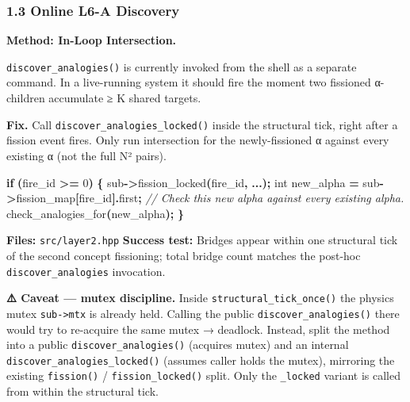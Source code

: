 \documentclass[
  11pt,
  a4paper,
]{article}
\newenvironment{Shaded}{\begin{snugshade}}{\end{snugshade}}
\newcommand{\CommentTok}[1]{\textcolor[rgb]{0.56,0.35,0.01}{\textit{#1}}}
\newcommand{\ControlFlowTok}[1]{\textcolor[rgb]{0.13,0.29,0.53}{\textbf{#1}}}
\newcommand{\DataTypeTok}[1]{\textcolor[rgb]{0.13,0.29,0.53}{#1}}
\newcommand{\DecValTok}[1]{\textcolor[rgb]{0.00,0.00,0.81}{#1}}
\newcommand{\NormalTok}[1]{#1}
\newcommand{\OperatorTok}[1]{\textcolor[rgb]{0.81,0.36,0.00}{\textbf{#1}}}
\begin{document}
\subsubsection{1.3 Online L6-A Discovery}\label{online-l6-a-discovery}

\textbf{Method: In-Loop Intersection.}

\texttt{discover\_analogies()} is currently invoked from the shell as a
separate command. In a live-running system it should fire the moment two
fissioned α-children accumulate ≥ K shared targets.

\textbf{Fix.} Call \texttt{discover\_analogies\_locked()} inside the
structural tick, right after a fission event fires. Only run
intersection for the newly-fissioned α against every existing α (not the
full N² pairs).

\begin{Shaded}
\begin{Highlighting}[]
\ControlFlowTok{if} \OperatorTok{(}\NormalTok{fire\_id }\OperatorTok{\textgreater{}=} \DecValTok{0}\OperatorTok{)} \OperatorTok{\{}
\NormalTok{    sub}\OperatorTok{{-}\textgreater{}}\NormalTok{fission\_locked}\OperatorTok{(}\NormalTok{fire\_id}\OperatorTok{,} \OperatorTok{...);}
    \DataTypeTok{int}\NormalTok{ new\_alpha }\OperatorTok{=}\NormalTok{ sub}\OperatorTok{{-}\textgreater{}}\NormalTok{fission\_map}\OperatorTok{[}\NormalTok{fire\_id}\OperatorTok{].}\NormalTok{first}\OperatorTok{;}
    \CommentTok{// Check this new alpha against every existing alpha.}
\NormalTok{    check\_analogies\_for}\OperatorTok{(}\NormalTok{new\_alpha}\OperatorTok{);}
\OperatorTok{\}}
\end{Highlighting}
\end{Shaded}

\textbf{Files:} \texttt{src/layer2.hpp} \textbf{Success test:} Bridges
appear within one structural tick of the second concept fissioning;
total bridge count matches the post-hoc \texttt{discover\_analogies}
invocation.

\textbf{⚠️ Caveat --- mutex discipline.} Inside
\texttt{structural\_tick\_once()} the physics mutex
\texttt{sub-\textgreater{}mtx} is already held. Calling the public
\texttt{discover\_analogies()} there would try to re-acquire the same
mutex → deadlock. Instead, split the method into a public
\texttt{discover\_analogies()} (acquires mutex) and an internal
\texttt{discover\_analogies\_locked()} (assumes caller holds the mutex),
mirroring the existing \texttt{fission()} / \texttt{fission\_locked()}
split. Only the \texttt{\_locked} variant is called from within the
structural tick.
\end{document}
